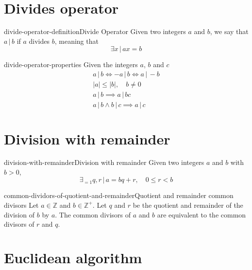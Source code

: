 \documentclass[preview]{standalone}
\newcommand{\divides}{\,|\,}
\begin{document}
\genpage

\section{Divides operator}

\begin{snippetdefinition}{divide-operator-definition}{Divide Operator}
    Given two integers \(a\) and \(b\),
    we say that \(a \divides b\) if \(a\) divides \(b\),
    meaning that
    \[
        \exists x \,|\, ax = b
    \]
\end{snippetdefinition}

\begin{snippet}{divide-operator-properties}
Given the integers \(a\), \(b\) and \(c\)
\begin{align*}
    a \divides b \iff -a \divides b \iff a \divides -b \\
    |a| \leq |b|, \quad b \neq 0 \\
    a \divides b \implies a \divides bc \\
    a \divides b \land b \divides c \implies a \divides c
\end{align*}
\end{snippet}

\section{Division with remainder}

\begin{snippetproposition}{division-with-remainder}{Division with remainder}
    Given two integers \(a\) and \(b\) with \(b > 0\),
    \[
        \exists_{=1} q,r \,|\, a=bq+r, \quad 0 \leq r < b
    \]
\end{snippetproposition}


\begin{snippetlemma}{common-dividors-of-quotient-and-remainder}{Quotient and remainder common divisors}
Let \(a \in \mathbb{Z}\) and \(b \in {\mathbb{Z}}^+\).
Let \(q\) and \(r\) be the quotient and remainder of the division of \(b\)
by \(a\).
The common divisors of \(a\) and \(b\) are equivalent to the common divisors of \(r\) and \(q\).
\end{snippetlemma}


\section{Euclidean algorithm}
\end{document}
